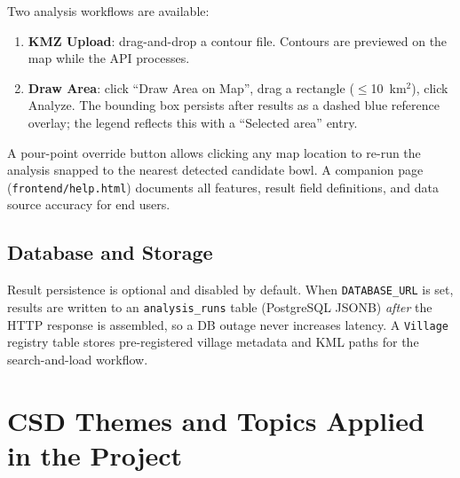 \documentclass[manuscript,screen,review,nonacm]{acmart}
\begin{document}
Two analysis workflows are available:
\begin{enumerate}
  \item \textbf{KMZ Upload}: drag-and-drop a contour file. Contours are
        previewed on the map while the API processes.
  \item \textbf{Draw Area}: click ``Draw Area on Map'', drag a rectangle
        ($\le$10~km$^2$), click Analyze. The bounding box persists after
        results as a dashed blue reference overlay; the legend reflects
        this with a ``Selected area'' entry.
\end{enumerate}

A pour-point override button allows clicking any map location to
re-run the analysis snapped to the nearest detected candidate bowl.
A companion page (\texttt{frontend/help.html}) documents all features,
result field definitions, and data source accuracy for end users.

\subsection{Database and Storage}

Result persistence is optional and disabled by default. When
\texttt{DATABASE\_URL} is set, results are written to an
\texttt{analysis\_runs} table (PostgreSQL JSONB) \emph{after} the HTTP
response is assembled, so a DB outage never increases latency.
A \texttt{Village} registry table stores pre-registered village metadata
and KML paths for the search-and-load workflow.

\section{CSD Themes and Topics Applied in the Project}
\label{sec:csd-themes}
\end{document}
